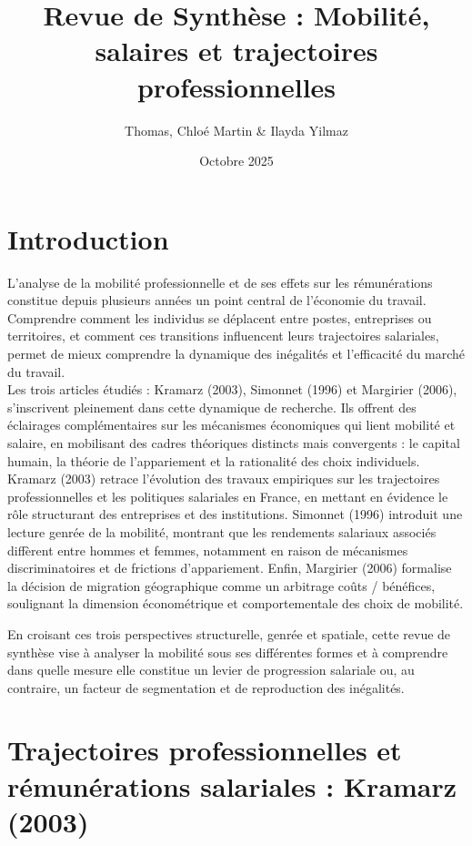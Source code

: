 \documentclass[12pt,a4paper]{article}
\title{Revue de Synthèse : Mobilité, salaires et trajectoires professionnelles}
\author{Thomas, Chloé Martin \& Ilayda Yilmaz}
\date{Octobre 2025}
\begin{document}
\maketitle

\section*{Introduction}

L’analyse de la mobilité professionnelle et de ses effets sur les rémunérations constitue depuis plusieurs années un point central de l’économie du travail. 
Comprendre comment les individus se déplacent entre postes, entreprises ou territoires, et comment ces transitions influencent leurs trajectoires salariales, permet de mieux comprendre la dynamique des inégalités et l’efficacité du marché du travail.  \\
Les trois articles étudiés : Kramarz (2003), Simonnet (1996) et Margirier (2006), s’inscrivent pleinement dans cette dynamique de recherche. 
Ils offrent des éclairages complémentaires sur les mécanismes économiques qui lient mobilité et salaire, en mobilisant des cadres théoriques distincts mais convergents : le capital humain, la théorie de l’appariement et la rationalité des choix individuels.  \\
Kramarz (2003) retrace l’évolution des travaux empiriques sur les trajectoires professionnelles et les politiques salariales en France, en mettant en évidence le rôle structurant des entreprises et des institutions.  
Simonnet (1996) introduit une lecture genrée de la mobilité, montrant que les rendements salariaux associés diffèrent entre hommes et femmes, notamment en raison de mécanismes discriminatoires et de frictions d’appariement.  
Enfin, Margirier (2006) formalise la décision de migration géographique comme un arbitrage coûts / bénéfices, soulignant la dimension économétrique et comportementale des choix de mobilité.  

En croisant ces trois perspectives structurelle, genrée et spatiale, cette revue de synthèse vise à analyser la mobilité sous ses différentes formes et à comprendre dans quelle mesure elle constitue un levier de progression salariale ou, au contraire, un facteur de segmentation et de reproduction des inégalités.

\newpage  

\section{Trajectoires professionnelles et rémunérations salariales : Kramarz (2003)}
\end{document}
